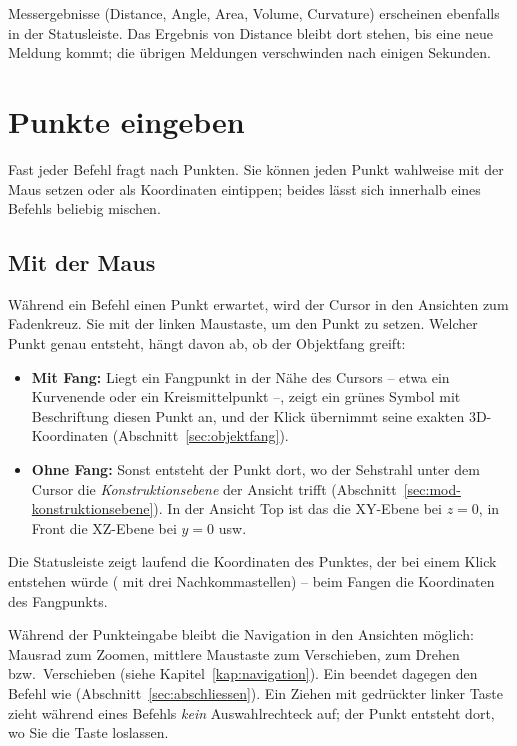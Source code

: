 Messergebnisse (Distance, Angle, Area, Volume, Curvature) erscheinen ebenfalls in der
Statusleiste. Das Ergebnis von Distance bleibt dort stehen, bis eine neue Meldung kommt; die
übrigen Meldungen verschwinden nach einigen Sekunden.

\section{Punkte eingeben}\label{sec:punkteingabe}

Fast jeder Befehl fragt nach Punkten. Sie können jeden Punkt wahlweise mit der Maus setzen oder
als Koordinaten eintippen; beides lässt sich innerhalb eines Befehls beliebig mischen.

\subsection{Mit der Maus}

Während ein Befehl einen Punkt erwartet, wird der Cursor in den Ansichten zum Fadenkreuz.
 Sie mit der linken Maustaste, um den Punkt zu setzen. Welcher Punkt genau
entsteht, hängt davon ab, ob der Objektfang greift:

\begin{itemize}
\item \textbf{Mit Fang:} Liegt ein Fangpunkt in der Nähe des Cursors -- etwa ein Kurvenende oder
  ein Kreismittelpunkt --, zeigt ein grünes Symbol mit Beschriftung diesen Punkt an, und der
  Klick übernimmt seine exakten 3D-Koordinaten (Abschnitt~\ref{sec:objektfang}).
\item \textbf{Ohne Fang:} Sonst entsteht der Punkt dort, wo der Sehstrahl unter dem Cursor die
  \emph{Konstruktionsebene} der Ansicht trifft (Abschnitt~\ref{sec:mod-konstruktionsebene}). In der
  Ansicht Top ist das die XY-Ebene bei $z=0$, in Front die XZ-Ebene bei $y=0$ usw.
\end{itemize}

Die Statusleiste zeigt laufend die Koordinaten des Punktes, der bei einem Klick entstehen würde
( mit drei Nachkommastellen) -- beim Fangen die Koordinaten des
Fangpunkts.

Während der Punkteingabe bleibt die Navigation in den Ansichten möglich: Mausrad zum Zoomen,
mittlere Maustaste zum Verschieben,  zum Drehen bzw.\ Verschieben (siehe
Kapitel~\ref{kap:navigation}). Ein  beendet dagegen den Befehl wie
 (Abschnitt~\ref{sec:abschliessen}). Ein Ziehen mit gedrückter linker Taste zieht
während eines Befehls \emph{kein} Auswahlrechteck auf; der Punkt entsteht dort, wo Sie die Taste
loslassen.

